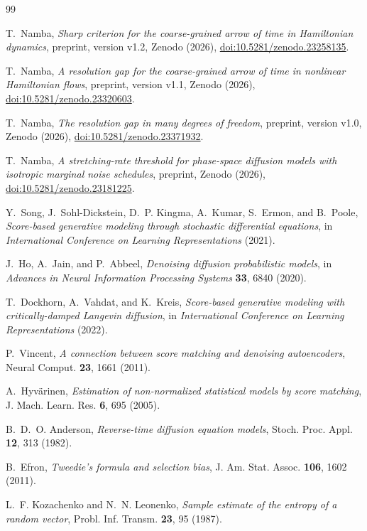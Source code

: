 \begin{thebibliography}{99}

T.~Namba, \textit{Sharp criterion for the coarse-grained arrow of time in Hamiltonian dynamics}, preprint, version v1.2, Zenodo (2026), \href{https://doi.org/10.5281/zenodo.23258135}{doi:10.5281/zenodo.23258135}.

T.~Namba, \textit{A resolution gap for the coarse-grained arrow of time in nonlinear Hamiltonian flows}, preprint, version v1.1, Zenodo (2026), \href{https://doi.org/10.5281/zenodo.23320603}{doi:10.5281/zenodo.23320603}.

T.~Namba, \textit{The resolution gap in many degrees of freedom}, preprint, version v1.0, Zenodo (2026), \href{https://doi.org/10.5281/zenodo.23371932}{doi:10.5281/zenodo.23371932}.

T.~Namba, \textit{A stretching-rate threshold for phase-space diffusion models with isotropic marginal noise schedules}, preprint, Zenodo (2026), \href{https://doi.org/10.5281/zenodo.23181225}{doi:10.5281/zenodo.23181225}.

Y.~Song, J.~Sohl-Dickstein, D.~P. Kingma, A.~Kumar, S.~Ermon, and B.~Poole, \textit{Score-based generative modeling through stochastic differential equations}, in \textit{International Conference on Learning Representations} (2021).

J.~Ho, A.~Jain, and P.~Abbeel, \textit{Denoising diffusion probabilistic models}, in \textit{Advances in Neural Information Processing Systems} \textbf{33}, 6840 (2020).

T.~Dockhorn, A.~Vahdat, and K.~Kreis, \textit{Score-based generative modeling with critically-damped Langevin diffusion}, in \textit{International Conference on Learning Representations} (2022).

P.~Vincent, \textit{A connection between score matching and denoising autoencoders}, Neural Comput. \textbf{23}, 1661 (2011).

A.~Hyv\"arinen, \textit{Estimation of non-normalized statistical models by score matching}, J. Mach. Learn. Res. \textbf{6}, 695 (2005).

B.~D.~O. Anderson, \textit{Reverse-time diffusion equation models}, Stoch. Proc. Appl. \textbf{12}, 313 (1982).

B.~Efron, \textit{Tweedie's formula and selection bias}, J. Am. Stat. Assoc. \textbf{106}, 1602 (2011).

L.~F. Kozachenko and N.~N. Leonenko, \textit{Sample estimate of the entropy of a random vector}, Probl. Inf. Transm. \textbf{23}, 95 (1987).

\end{thebibliography}
